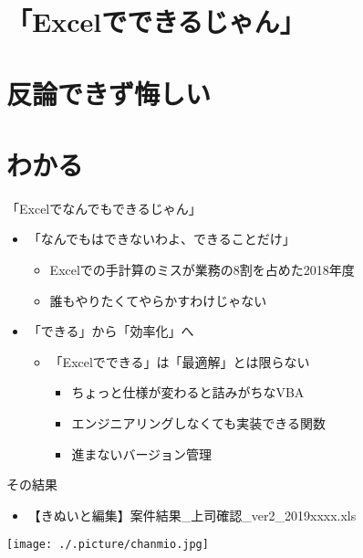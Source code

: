 \documentclass[ignorenonframetext,]{beamer}
\providecommand{\tightlist}{%
  \setlength{\itemsep}{0pt}\setlength{\parskip}{0pt}}
\begin{document}
\hypertarget{excel}{%
\section{「Excelでできるじゃん」}\label{excel}}

\section{反論できず悔しい}

\section{わかる}

\begin{frame}{「Excelでなんでもできるじゃん」}
\protect\hypertarget{excel}{}

\begin{itemize}
\tightlist
\item
  「なんでもはできないわよ、できることだけ」

  \begin{itemize}
  \tightlist
  \item
    Excelでの手計算のミスが業務の8割を占めた2018年度
  \item
    誰もやりたくてやらかすわけじゃない
  \end{itemize}
\item
  「できる」から「効率化」へ

  \begin{itemize}
  \tightlist
  \item
    「Excelでできる」は「最適解」とは限らない

    \begin{itemize}
    \tightlist
    \item
      ちょっと仕様が変わると詰みがちなVBA
    \item
      エンジニアリングしなくても実装できる関数
    \item
      進まないバージョン管理
    \end{itemize}
  \end{itemize}
\end{itemize}

\end{frame}

\begin{frame}{その結果}

\begin{itemize}
\tightlist
\item
  【きぬいと編集】案件結果\_上司確認\_ver2\_2019xxxx.xls
\end{itemize}

\texttt{[image: ./.picture/chanmio.jpg]}

\end{frame}
\end{document}
